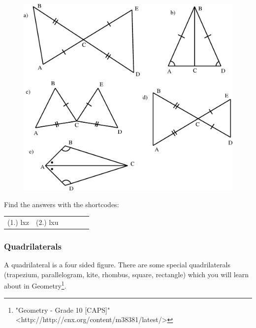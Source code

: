 \begin{enumerate}[noitemsep, label=\textbf{\arabic*}. ]
\begin{figure}[H]
\begin{center}
    \label{m39368*id318571!!!underscore!!!media}\label{m39368*id318571!!!underscore!!!printimage}\includegraphics{col11306.imgs/m39368_MG10C13_039.png} %
      \vspace{2pt}
    \vspace{.1in}
    \end{center}
 \end{figure}               \end{enumerate}
      \label{m39368*eip-75}
\par {} Find the answers with the shortcodes:
 \par \begin{tabular}[h]{cccccc}
 (1.) lxz  &  (2.) lxu  & \end{tabular}
            \subsubsection{ Quadrilaterals}
            \nopagebreak
            \label{m39368*eip-366}
A quadrilateral is a four sided figure. There are some special quadrilaterals (trapezium, parallelogram, kite, rhombus, square, rectangle) which you will learn about in Geometry\footnote{\raggedright{}"Geometry - Grade 10 [CAPS]" <http://http://cnx.org/content/m38381/latest/>}. 
\par \label{m39368*uid91}
